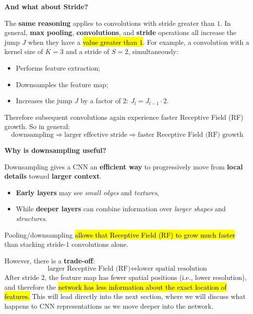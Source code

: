 \highspace
\begin{flushleft}
    \textcolor{Green3}{ \textbf{And what about Stride?}}
\end{flushleft}
The \textbf{same reasoning} applies to convolutions with stride greater than $1$. In general, \textbf{max pooling}, \textbf{convolutions}, and \textbf{stride} operations all increase the jump $J$ when they have a \hl{value greater than $1$}. For example, a convolution with a kernel size of $K = 3$ and a stride of $S = 2$, simultaneously:
\begin{itemize}
    \item Performs feature extraction;
    \item Downsamples the feature map;
    \item Increases the jump $J$ by a factor of $2$: $J_{l} = J_{l-1} \cdot 2$.
\end{itemize}
Therefore subsequent convolutions again experience faster Receptive Field (RF) growth. So in general:
\begin{equation*}
    \text{downsampling} \Rightarrow \text{larger effective stride} \Rightarrow \text{faster Receptive Field (RF) growth}
\end{equation*}

\highspace
\begin{flushleft}
    \textcolor{Green3}{ \textbf{Why is downsampling useful?}}
\end{flushleft}
Downsampling gives a CNN an \textbf{efficient way} to progressively move from \textbf{local details} toward \textbf{larger context}.
\begin{itemize}
    \item[\textcolor{Green3}{\faIcon{layer-group}}] \textbf{Early layers} may see \emph{small edges} and \emph{textures},
    \item[\textcolor{Green3}{\faIcon{cubes}}] While \textbf{deeper layers} can combine information over \emph{larger shapes} and \emph{structures}.
\end{itemize}
Pooling/downsampling \hl{allows that Receptive Field (RF) to grow much faster} than stacking stride-1 convolutions alone.

\highspace
\textcolor{Red2}{} However, there is a \textbf{trade-off}:
\begin{equation*}
    \text{larger Receptive Field (RF)} \iff \text{lower spatial resolution}
\end{equation*}
After stride $2$, the feature map has fewer spatial positions (i.e., lower resolution), and therefore the \hl{network has less information about the exact location of features.} This will lead directly into the next section, where we will discuss what happens to CNN representations as we move deeper into the network.


